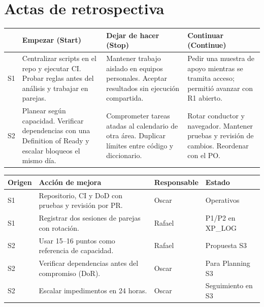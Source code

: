 \documentclass[10pt,a4paper]{article}
\begin{document}
\section{Actas de retrospectiva}
{\footnotesize
\begin{tabularx}{\linewidth}{@{}l L L L@{}}
\toprule
 & Empezar (Start) & Dejar de hacer (Stop) & Continuar (Continue) \\
\midrule
S1 & Centralizar scripts en el repo y ejecutar CI. Probar reglas antes del análisis y trabajar en parejas. & Mantener trabajo aislado en equipos personales. Aceptar resultados sin ejecución compartida. & Pedir una muestra de apoyo mientras se tramita acceso; permitió avanzar con R1 abierto. \\
S2 & Planear según capacidad. Verificar dependencias con una Definition of Ready y escalar bloqueos el mismo día. & Comprometer tareas atadas al calendario de otra área. Duplicar límites entre código y diccionario. & Rotar conductor y navegador. Mantener pruebas y revisión de cambios. Reordenar con el PO. \\
\bottomrule
\end{tabularx}}

\newpage
{\footnotesize
\begin{tabularx}{\linewidth}{@{}l L l l@{}}
\toprule
Origen & Acción de mejora & Responsable & Estado \\
\midrule
S1 & Repositorio, CI y DoD con pruebas y revisión por PR. & Oscar & Operativos \\
S1 & Registrar dos sesiones de parejas con rotación. & Rafael & P1/P2 en XP\_LOG \\
S2 & Usar 15--16 puntos como referencia de capacidad. & Rafael & Propuesta S3 \\
S2 & Verificar dependencias antes del compromiso (DoR). & Oscar & Para Planning S3 \\
S2 & Escalar impedimentos en 24 horas. & Oscar & Seguimiento en S3 \\
\bottomrule
\end{tabularx}}
\end{document}
